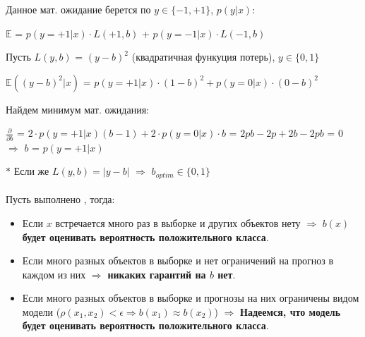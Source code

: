         Данное мат. ожидание берется по $y \in \{-1, +1\}$, $p(y | x)$:
        \begin{center}
            $\mathbb{E}$ = $p(y = +1 | x) \cdot L(+1, b)$ + $p(y = -1 | x) \cdot L(-1, b)$
        \end{center}

        \begin{center}
        \end{center}
        Пусть $L(y, b)$ = $(y - b)^2$ (квадратичная функуция потерь), \quad\quad $y \in \{0, 1\}$\\

        \begin{center}
            $\mathbb{E}((y - b)^2 | x)$ = $p(y = +1 | x) \cdot (1 - b)^2 + p(y = 0 | x) \cdot (0 - b)^2$
        \end{center}

        Найдем минимум мат. ожидания:

        \begin{center}
            $\frac{\partial}{\partial b}$ = $2 \cdot p(y = +1 | x)(b - 1) + 2 \cdot p(y = 0 | x) \cdot b$ = $2pb - 2p + 2b - 2pb$ = $0$ $\Longrightarrow$ $b$ = $p(y = +1 | x)$
        \end{center}

        $\ast$ Если же $L(y, b) = |y - b|$ $\Longrightarrow$ $b_{optim} \in \{0, 1\}$\\\\

        
        Пусть выполнено , тогда:\\
        \begin{itemize}
            \item Если $x$ встречается много раз в выборке и других объектов нету $\Longrightarrow$ \textbf{$b(x)$ будет оценивать вероятность положительного класса}.

            \item Если много разных объектов в выборке и нет ограничений на прогноз в каждом из них $\Longrightarrow$ \textbf{никаких гарантий на $b$ нет}.

            \item Если много разных объектов в выборке и прогнозы на них ограничены видом модели ($\rho(x_1, x_2) < \epsilon \Longrightarrow b(x_1) \approx b(x_2)$) $\Longrightarrow$ \textbf{Надеемся, что модель будет оценивать вероятность положительного класса}.
        \end{itemize}

